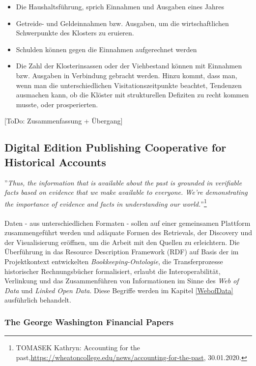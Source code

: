 \documentclass[12pt,a4paper]{article}
\begin{document}
\begin{itemize}
\item Die Haushaltsführung, sprich Einnahmen und Ausgaben eines Jahres 
\item Getreide- und Geldeinnahmen bzw. Ausgaben, um die wirtschaftlichen Schwerpunkte des Klosters zu eruieren.
\item Schulden können gegen die Einnahmen aufgerechnet werden 
\item Die Zahl der Klosterinsassen oder der Viehbestand können mit Einnahmen bzw. Ausgaben in Verbindung gebracht werden. Hinzu kommt, dass man, wenn man die unterschiedlichen Visitationszeitpunkte beachtet,
Tendenzen ausmachen kann, ob die Klöster mit strukturellen Defiziten zu recht kommen musste, oder prosperierten.
\end{itemize} 

[ToDo: Zusammenfassung + Übergang]


\newpage
\subsection{Digital Edition Publishing Cooperative for Historical Accounts}
\label{DEPCHA}

''\textit{Thus, the information that is available about the past is grounded in verifiable facts based on evidence that we make available to everyone. We’re demonstrating the importance of evidence and facts in understanding our world.}''\footnote{TOMASEK Kathryn: Accounting for the past,\url{https://wheatoncollege.edu/news/accounting-for-the-past}, 30.01.2020.}
\\
\\
Daten - aus unterschiedlichen Formaten - sollen auf einer gemeinsamen Plattform zusammengeführt werden und adäquate Formen des Retrievals, der Discovery und der Visualisierung eröffnen, um die Arbeit mit den Quellen zu erleichtern. Die Überführung in das Resource Description Framework (RDF) auf Basis der im Projektkontext entwickelten \textit{Bookkeeping-Ontologie}, die Transferprozesse historischer Rechnungsbücher formalisiert, erlaubt die Interoperabilität, Verlinkung und das Zusammenführen von Informationen im Sinne des \textit{Web of Data} und \textit{Linked Open Data}. Diese Begriffe werden im Kapitel \ref{WebofData} ausführlich behandelt.


\subsubsection{The George Washington Financial Papers}
\end{document}
